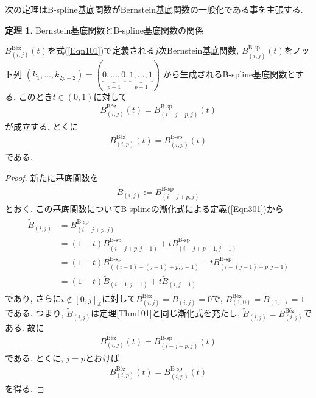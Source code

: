 \documentclass{jsarticle}
\newcommand\squa[1]{[#1]}
\newcommand\Z[2]{\squa{#1,#2}_\mathbb{Z}}
\theoremstyle{definition}%
\newtheorem{thm}{定理}
\begin{document}
\newpage
次の定理はB-spline基底関数がBernstein基底関数の一般化である事を主張する.
\begin{screen}
	\begin{thm}
		\label{Thm307}
		Bernstein基底関数とB-spline基底関数の関係

		$B_{(i,j)}^{\text{B\'ez}}(t)$を式(\ref{Eqn101})で定義される$j$次Bernstein基底関数,
		$B_{(i,j)}^{\text{B-sp}}(t)$をノット列
		$
			(k_1,\dots,k_{2p+2})
			=
			(
			\underbrace{0,\dots,0}_{p+1},
			\underbrace{1,\dots,1}_{p+1}
			)
		$
		から生成されるB-spline基底関数とする.
		このとき$t\in (0,1)$に対して
		\begin{align}
			B_{(i,j)}^{\text{B\'ez}}(t)=B_{(i-j+p,j)}^{\text{B-sp}}(t)
		\end{align}
		が成立する.
		とくに
		\begin{align}
			B_{(i,p)}^{\text{B\'ez}}(t)=B_{(i,p)}^{\text{B-sp}}(t)
		\end{align}
		である.
	\end{thm}
\end{screen}
\begin{proof}
	新たに基底関数を
	\begin{align}
		\tilde{B}_{(i,j)}:=B_{(i-j+p,j)}^{\text{B-sp}}
	\end{align}
	とおく.
	この基底関数についてB-splineの漸化式による定義(\ref{Eqn301})から
	\begin{align}
		\begin{aligned}
			\tilde{B}_{(i,j)}
			&=B_{(i-j+p,j)}^{\text{B-sp}} \\
			&=(1-t)B_{(i-j+p,j-1)}^{\text{B-sp}}+tB_{(i-j+p+1,j-1)}^{\text{B-sp}} \\
			&=(1-t)B_{((i-1)-(j-1)+p,j-1)}^{\text{B-sp}}+tB_{(i-(j-1)+p,j-1)}^{\text{B-sp}} \\
			&=(1-t)\tilde{B}_{(i-1,j-1)}+t\tilde{B}_{(i,j-1)}
		\end{aligned}
	\end{align}
	であり, さらに$i\notin \Z{0}{j}$に対して$B_{(i,j)}^{\text{B\'ez}}=\tilde{B}_{(i,j)}=0$で, $B_{(1,0)}^{\text{B\'ez}}=\tilde{B}_{(1,0)}=1$である.
    つまり, $\tilde{B}_{(i,j)}$は定理\ref{Thm101}と同じ漸化式を充たし, $\tilde{B}_{(i,j)}=B_{(i,j)}^{\text{B\'ez}}$である.
	故に
	\begin{align}
		B_{(i,j)}^{\text{B\'ez}}(t)=B_{(i-j+p,j)}^{\text{B-sp}}(t)
	\end{align}
	である.
    とくに, $j=p$とおけば
	\begin{align}
		B_{(i,p)}^{\text{B\'ez}}(t)=B_{(i,p)}^{\text{B-sp}}(t)
	\end{align}
	を得る.\footnotemark
\end{proof}
\end{document}
